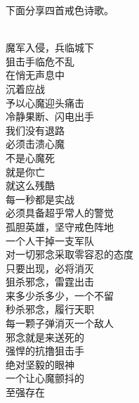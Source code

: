 下面分享四首戒色诗歌。

\begin{poem}[抗撸狙击手]
    \begin{multicols}{2}
        \centering~\\
        魔军入侵，兵临城下 \\ 狙击手临危不乱 \\ 在悄无声息中 \\ 沉着应战 \\ 予以心魔迎头痛击 \\ 冷静果断、闪电出手 \\ 我们没有退路 \\ 必须击溃心魔 \\ 不是心魔死 \\ 就是你亡 \\ 就这么残酷 \\ 每一秒都是实战 \\ 必须具备超乎常人的警觉 \\ 孤胆英雄，坚守戒色阵地 \\ 一个人干掉一支军队 \\ 对一切邪念采取零容忍的态度 \\ 只要出现，必将消灭 \\ 狙杀邪念，雷霆出击 \\ 来多少杀多少，一个不留 \\ 秒杀邪念，履行天职 \\ 每一颗子弹消灭一个敌人 \\ 邪念就是来送死的 \\ 强悍的抗撸狙击手 \\ 绝对坚毅的眼神 \\ 一个让心魔颤抖的 \\ 至强存在
    \end{multicols}
\end{poem}

